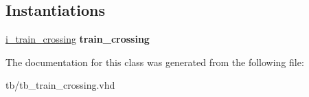 \subsection*{Instantiations}
 \begin{DoxyCompactItemize}
\item 
\mbox{\label{classtb__train__crossing_1_1sim_acecfa95f3e53a1c5b0c8189d7e12d86f}} 
\hyperlink{classtb__train__crossing_1_1sim_acecfa95f3e53a1c5b0c8189d7e12d86f}{i\+\_\+train\+\_\+crossing}  {\bfseries train\+\_\+crossing}   
\end{DoxyCompactItemize}


The documentation for this class was generated from the following file\+:\begin{DoxyCompactItemize}
\item 
tb/tb\+\_\+train\+\_\+crossing.\+vhd\end{DoxyCompactItemize}
